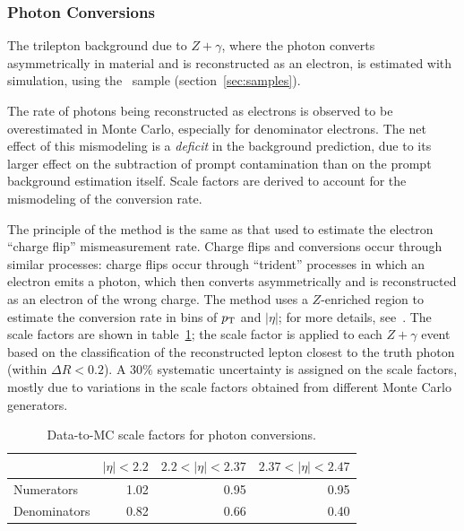 \subsubsection{Photon Conversions}\label{sec:photon-conversions}
The trilepton background due to $Z+\gamma$, where the photon converts asymmetrically in material and is reconstructed as an electron, is estimated with simulation, using the \sherpa~sample (section~\ref{sec:samples}).

The rate of photons being reconstructed as electrons is observed to be overestimated in Monte Carlo, especially for denominator electrons. The net effect of this mismodeling is a \emph{deficit} in the background prediction, due to its larger effect on the subtraction of prompt contamination than on the prompt background estimation itself. Scale factors are derived to account for the mismodeling of the conversion rate. 

The principle of the method is the same as that used to estimate the electron ``charge flip'' mismeasurement rate. Charge flips and conversions occur through similar processes: charge flips occur through ``trident'' processes in which an electron emits a photon, which then converts asymmetrically and is reconstructed as an electron of the wrong charge. The method uses a $Z$-enriched region to estimate the conversion rate in bins of $p_{\text{T}}$ and $|\eta|$; for more details, see~\cite{DeViveiros:1670929}. The scale factors are shown in table~\ref{table:conversion-sfs}; the scale factor is applied to each $Z+\gamma$ event based on the classification of the reconstructed lepton closest to the truth photon (within $\Delta R<0.2$). A $30\%$ systematic uncertainty is assigned on the scale factors, mostly due to variations in the scale factors obtained from different Monte Carlo generators. 

\begin{table}[tbp]
  \centering
  \begin{tabular}{l r r r}
					 &$|\eta|<2.2$     &$2.2<|\eta|<2.37$     &$2.37<|\eta|<2.47$\\
	\hline
	Numerators       &1.02             &0.95                  &0.95\\
	Denominators     &0.82             &0.66                  &0.40\\
  \end{tabular}
  \caption{Data-to-MC scale factors for photon conversions.}
  \label{table:conversion-sfs}
\end{table}




